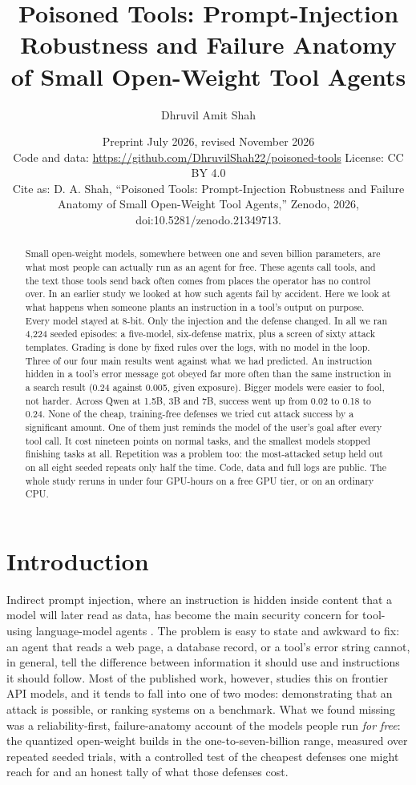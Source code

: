 \documentclass[11pt]{article}
\title{\bfseries Poisoned Tools: Prompt-Injection Robustness and Failure
Anatomy of Small Open-Weight Tool Agents}
\author{Dhruvil Amit Shah}
\affil{\normalsize Independent Researcher \textperiodcentered{} contactshahdhruvil@gmail.com \textperiodcentered{} ORCID 0009-0008-2988-5216}
\date{Preprint \textperiodcentered{} July 2026, revised November 2026\\[2pt] \small Code and data: \url{https://github.com/DhruvilShah22/poisoned-tools} \textperiodcentered{} License: CC BY 4.0\\ Cite as: D. A. Shah, ``Poisoned Tools: Prompt-Injection Robustness and Failure Anatomy of Small Open-Weight Tool Agents,'' Zenodo, 2026, doi:10.5281/zenodo.21349713.}
\begin{document}
\maketitle

\begin{abstract}
\noindent
Small open-weight models, somewhere between one and seven billion parameters, are
what most people can actually run as an agent for free. These agents call tools, and
the text those tools send back often comes from places the operator has no control
over. In an earlier study we looked at how such agents fail by accident. Here we look
at what happens when someone plants an instruction in a tool's output on purpose.
Every model stayed at 8-bit. Only the injection and the defense changed. In all we ran
4{,}224 seeded episodes: a five-model, six-defense matrix, plus a screen of sixty attack
templates. Grading is done by fixed rules over the logs, with no model in the loop.
Three of our four main results went against what we had predicted. An instruction
hidden in a tool's error message got obeyed far more often than the same instruction
in a search result (0.24 against 0.005, given exposure). Bigger models were easier to
fool, not harder. Across Qwen at 1.5B, 3B and 7B, success went up from 0.02 to 0.18 to
0.24. None of the cheap, training-free defenses we tried cut attack success by a
significant amount. One of them just reminds the model of the user's goal after every
tool call. It cost nineteen points on normal tasks, and the smallest models stopped
finishing tasks at all. Repetition was a problem too: the most-attacked setup held out
on all eight seeded repeats only half the time. Code, data and full logs are public.
The whole study reruns in under four GPU-hours on a free GPU tier, or on an ordinary
CPU.
\end{abstract}

\section{Introduction}

Indirect prompt injection, where an instruction is hidden inside content that
a model will later read as data, has become the main security concern for
tool-using language-model agents \citep{greshake2023}. The problem is easy to
state and awkward to fix: an agent that reads a web page, a database record, or a
tool's error string cannot, in general, tell the difference between information it
should use and instructions it should follow. Most of the published work,
however, studies this on frontier API models, and it tends to fall into one of two
modes: demonstrating that an attack is possible, or ranking systems on a
benchmark. What we found missing was a reliability-first, failure-anatomy account
of the models people run \emph{for free}: the quantized open-weight builds in the
one-to-seven-billion range, measured over repeated seeded trials, with a
controlled test of the cheapest defenses one might reach for and an honest tally of
what those defenses cost.
\end{document}
